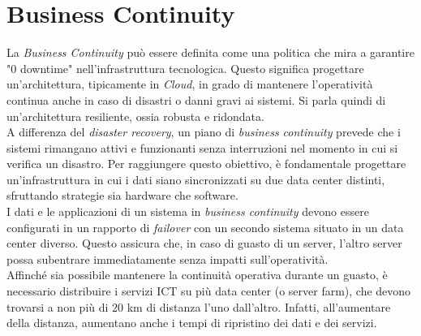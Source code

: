\documentclass[12pt]{report}
\begin{document}
	\section{Business Continuity}
	La \textit{Business Continuity} può essere definita come una politica che mira a garantire "0 downtime" nell'infrastruttura tecnologica. Questo significa progettare un'architettura, tipicamente in \textit{Cloud}, in grado di mantenere l'operatività continua anche in caso di disastri o danni gravi ai sistemi. Si parla quindi di un'architettura resiliente, ossia robusta e ridondata.
	\vspace{\baselineskip}\\
	A differenza del \textit{disaster recovery}, un piano di \textit{business continuity} prevede che i sistemi rimangano attivi e funzionanti senza interruzioni nel momento in cui si verifica un disastro. Per raggiungere questo obiettivo, è fondamentale progettare un'infrastruttura in cui i dati siano sincronizzati su due data center distinti, sfruttando strategie sia hardware che software.
	\vspace{\baselineskip}\\
	I dati e le applicazioni di un sistema in \textit{business continuity} devono essere configurati in un rapporto di \textit{failover} con un secondo sistema situato in un data center diverso. Questo assicura che, in caso di guasto di un server, l'altro server possa subentrare immediatamente senza impatti sull'operatività.
	\vspace{\baselineskip}\\
	Affinché sia possibile mantenere la continuità operativa durante un guasto, è necessario distribuire i servizi ICT su più data center (o server farm), che devono trovarsi a non più di 20 km di distanza l'uno dall'altro. Infatti, all'aumentare della distanza, aumentano anche i tempi di ripristino dei dati e dei servizi.
\end{document}
